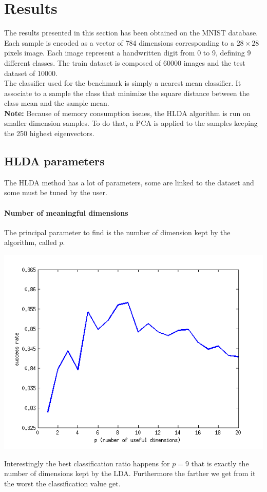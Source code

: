 
\section{Results}
\label{sec:results}

The results presented in this section has been obtained on the MNIST database.
Each sample is encoded as a vector of 784 dimensions corresponding to a $28 \times 28$
pixels image. Each image represent a handwritten digit from 0 to 9, defining 9 different
classes.
The train dataset is composed of 60000 images and the test dataset of 10000.\\

The classifier used for the benchmark is simply a nearest mean classifier.
It associate to a sample the class that minimize the square distance between the class mean and
the sample mean.\\

{\bf Note:} Because of memory consumption issues, the HLDA algorithm is
run on smaller dimension samples. To do that, a PCA is applied to the samples keeping the
250 highest eigenvectors.

\subsection{HLDA parameters}

The HLDA method has a lot of parameters, some are linked to the dataset and some must be tuned
by the user.

\paragraph{Number of meaningful dimensions} The principal parameter to find is the number of dimension kept
by the algorithm, called $p$.

\begin{center}
  \includegraphics[scale=0.75]{img/bench-classes}
\end{center}

Interestingly the best classification ratio happens for $p = 9$ that
is exactly the number of dimensions kept by the LDA. Furthermore the farther we get from
it the worst the classification value get.
